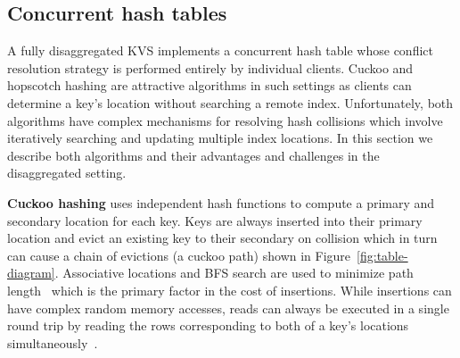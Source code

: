\subsection{Concurrent hash tables} 
\label{sec:cuckoo-back}

A fully disaggregated KVS implements a concurrent hash table whose
conflict resolution strategy is performed entirely by individual
clients.
Cuckoo and hopscotch hashing are attractive algorithms in such
settings as clients can determine a key's location without searching a
remote index. Unfortunately, both algorithms have complex mechanisms
for resolving hash collisions which involve iteratively searching and
updating multiple index locations. In this section we describe both
algorithms and their advantages and challenges in the disaggregated
setting.





\textbf{Cuckoo hashing} uses independent hash functions to compute a primary and secondary location
for each key. Keys are always inserted into their primary location and evict an existing key to
their secondary on collision which in turn can cause a chain of evictions (a cuckoo path) shown in
Figure~\ref{fig:table-diagram}. Associative locations and BFS search are used to minimize path
length~\cite{memc3,cuckoo-improvements} which is the primary factor in the cost of insertions.
While insertions can have complex random memory accesses, reads can always be executed in a single
round trip by reading the rows corresponding to both of a key's locations
simultaneously~\cite{memc3,cuckoo-improvements,pilaf}.

